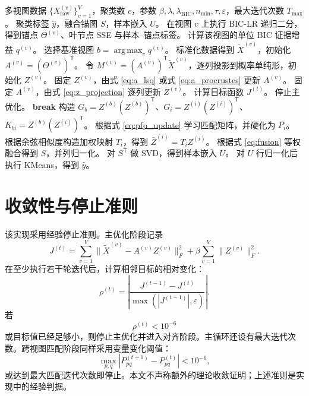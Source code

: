 \documentclass[UTF8,a4paper,12pt,fontset=none]{ctexart}
\newcommand{\argmax}{\operatorname*{arg\,max}}
\newcommand{\epsv}{\varepsilon}
\newcommand{\BIC}{\mathrm{BIC}}
\newcommand{\T}{\mathsf{T}}
\begin{document}
\begin{algorithm}[H]
\caption{BIC-LR 自适应锚点图多视图聚类}
\begin{algorithmic}[1]
\Require 多视图数据 \(\{X_{\mathrm{raw}}^{(v)}\}_{v=1}^{V}\)，聚类数 \(c\)，参数 \(\beta,\lambda,\lambda_{\BIC},n_{\min},\tau,\epsv\)，最大迭代次数 \(T_{\max}\)。
\Ensure 聚类标签 \(\hat y\)，融合锚图 \(S\)，样本嵌入 \(U\)。
  \State 在视图 \(v\) 上执行 BIC-LR 递归二分，得到锚点 \(\Theta^{(v)}\)、叶节点 SSE 与样本--锚点标签。
  \State 计算该视图的单位 BIC 证据增益 \(q^{(v)}\)。
\EndFor
\State 选择基准视图 \(b=\argmax_v q^{(v)}\)。
  \State 标准化数据得到 \(\widetilde X^{(v)}\)，初始化 \(A^{(v)}=(\Theta^{(v)})^\T\)。
  \State 令 \(M^{(v)}=(A^{(v)})^\T\widetilde X^{(v)}\)，逐列投影到概率单纯形，初始化 \(Z^{(v)}\)。
\EndFor
{}
    \State 固定 \(Z^{(v)}\)，由式 \eqref{eq:a_lsq} 或式 \eqref{eq:a_procrustes} 更新 \(A^{(v)}\)。
    \State 固定 \(A^{(v)}\)，由式 \eqref{eq:z_projection} 逐列更新 \(Z^{(v)}\)。
  \EndFor
  \State 计算目标函数 \(J^{(t)}\)。
    \State 停止主优化。
    \State \textbf{break}
  \EndIf
\EndFor
{}
  \State 构造 \(G_b=Z^{(b)}(Z^{(b)})^\T\)、\(G_i=Z^{(i)}(Z^{(i)})^\T\)、\(K_{bi}=Z^{(b)}(Z^{(i)})^\T\)。
  \State 根据式 \eqref{eq:pfp_update} 学习匹配矩阵，并硬化为 \(P_i\)。
  \State 根据余弦相似度构造加权映射 \(T_i\)，得到 \(\bar Z^{(i)}=T_iZ^{(i)}\)。
\EndFor
\State 根据式 \eqref{eq:fusion} 等权融合得到 \(S\)，并列归一化。
\State 对 \(S^\T\) 做 SVD，得到样本嵌入 \(U\)。
\State 对 \(U\) 行归一化后执行 KMeans，得到 \(\hat y\)。
\end{algorithmic}
\end{algorithm}

\section{收敛性与停止准则}

该实现采用经验停止准则。主优化阶段记录
\begin{equation}
J^{(t)}
=
\sum_{v=1}^{V}
\|\widetilde X^{(v)}-A^{(v)}Z^{(v)}\|_F^2
+\beta
\sum_{v=1}^{V}
\|Z^{(v)}\|_F^2 .
\end{equation}
在至少执行若干轮迭代后，计算相邻目标的相对变化：
\begin{equation}
\rho^{(t)}
=
\left|
\frac{J^{(t-1)}-J^{(t)}}
{\max(|J^{(t-1)}|,\epsv)}
\right|.
\end{equation}
若
\begin{equation}
\rho^{(t)}<10^{-6}
\end{equation}
或目标值已经足够小，则停止主优化并进入对齐阶段。主循环还设有最大迭代次数。跨视图匹配阶段同样采用变量变化阈值：
\begin{equation}
\max_{p,q}|P_{pq}^{(t+1)}-P_{pq}^{(t)}|<10^{-6},
\end{equation}
或达到最大匹配迭代次数即停止。本文不声称额外的理论收敛证明；上述准则是实现中的经验判据。
\end{document}
